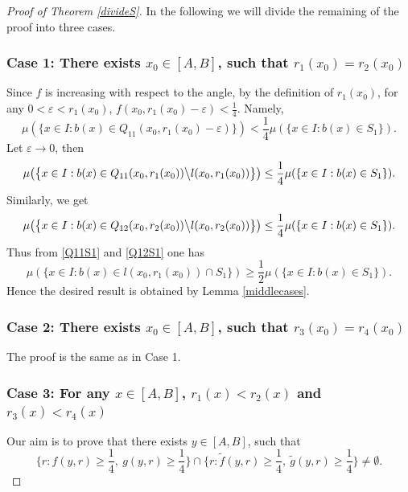 \documentclass[oneside,english,a4wide]{amsart}
\numberwithin{equation}{section}
\numberwithin{figure}{section}
\theoremstyle{plain}
\theoremstyle{plain}
\theoremstyle{definition}
\theoremstyle{plain}
\theoremstyle{remark}
\theoremstyle{definition}
\theoremstyle{remark}
\theoremstyle{definition}
\newcommand{\8}{\infty}
\begin{document}
\begin{proof}[Proof of Theorem \ref{divideS}]
	
	\smallskip
	
	In the following we will divide the remaining of the proof into three cases.
	
	\subsubsection*{Case 1: There exists $x_0\in [A,B]$, such that $r_1(x_0)=r_2(x_0)$}	
	Since $f$ is increasing with respect to the angle, by the definition of $r_1(x_0)$, for any $0<\varepsilon<r_1(x_0)$, $f(x_0,r_1(x_0)-\varepsilon)<\frac{1}{4}$. Namely,
	\begin{equation*}
		\mu(\{x\in I:b(x)\in Q_{11}(x_0,r_1(x_0)-\varepsilon)\})<\frac{1}{4}\mu(\{x\in I:b(x)\in S_1\}).
	\end{equation*} 
	Let $\varepsilon\to 0$, then 
	\begin{equation}\label{Q11S1}
		\mu\big(\big\{x\in I:b(x)\in Q_{11}(x_0,r_1(x_0))\big\backslash l(x_0,r_1(x_0))\big\}\big)\le \frac{1}{4}\mu(\{x\in I:b(x)\in S_1\}).
	\end{equation} 
	Similarly, we get
	\begin{equation}\label{Q12S1}
		\mu\big(\big\{x\in I:b(x)\in Q_{12}(x_0,r_2(x_0))\big\backslash l(x_0,r_2(x_0))\big\}\big)\le \frac{1}{4}\mu(\{x\in I:b(x)\in S_1\}).
	\end{equation} 
	Thus from \eqref{Q11S1} and \eqref{Q12S1} one has
	\begin{equation*}
		\mu(\{x\in I:b(x)\in l(x_0,r_1(x_0))\cap S_1 \})\ge \frac{1}{2}\mu(\{x\in I:b(x)\in S_1\}).
	\end{equation*} 
	Hence the desired result is obtained by Lemma \ref{middlecases}.
	
	\bigskip
	
	\subsubsection*{Case 2: There exists $x_0\in [A,B]$, such that $r_3(x_0)=r_4(x_0)$}			
	The proof is the same as in Case 1.
	
	\bigskip
	
	\subsubsection*{Case 3: For any $x\in [A,B]$, $r_1(x)<r_2(x)$ and $r_3(x)<r_4(x)$}
	Our aim is to prove that there exists $y\in [A,B]$, such that
	\begin{equation}\label{achieve}
		\Big\{r:f(y,r)\ge \frac{1}{4}, \ g(y,r)\ge \frac{1}{4}\Big\}\cap \Big\{r:\tilde{f}(y,r)\ge \frac{1}{4}, \  \tilde{g}(y,r)\ge \frac{1}{4}\Big\}\neq \emptyset.
	\end{equation}
	

\end{proof}
\end{document}

